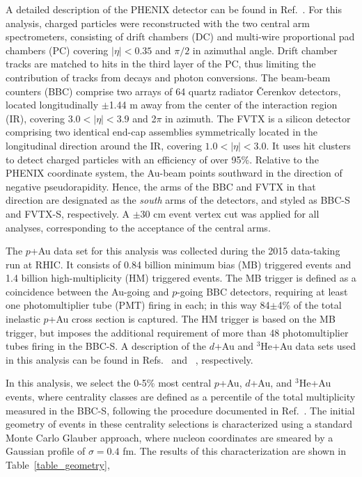 \documentclass[%
reprint,
showpacs,preprintnumbers,
 amsmath,amssymb,
 aps,
]{revtex4-1}
\newcommand{\dau}{\mbox{$d$+Au}\xspace}
\newcommand{\pau}{\mbox{$p$+Au}\xspace}
\newcommand{\hau}{\mbox{$^3\text{He}$+Au}\xspace}
\newcommand{\bbceta}{\mbox{$3.0<|\eta|<3.9$}\xspace}
\begin{document}
A detailed description of the PHENIX detector can be found in Ref.~\cite{Adcox2003469}. For this analysis, charged particles were reconstructed with the two central arm spectrometers, consisting of drift chambers (DC) and multi-wire proportional pad chambers (PC) covering $|\eta|<0.35$ and $\pi/2$ in azimuthal angle. Drift chamber tracks are matched to hits in the third layer of the PC, thus limiting the contribution of tracks from decays and photon conversions. The beam-beam counters (BBC) comprise two arrays of 64 quartz radiator \v{C}erenkov detectors, located longitudinally $\pm$1.44 m away from the center of the interaction region (IR), covering \bbceta and 2$\pi$ in azimuth. The FVTX is a silicon detector comprising two identical end-cap assemblies symmetrically located in the longitudinal direction around the IR, covering $1.0 < |\eta| < 3.0$. It uses hit clusters to detect charged particles with an efficiency of over 95\%. Relative to the PHENIX coordinate system, the Au-beam points southward in the direction of negative pseudorapidity. Hence, the arms of the BBC and FVTX in that direction are designated as the \emph{south} arms of the detectors, and styled as BBC-S and FVTX-S, respectively.
A $\pm$30 cm event vertex cut was applied for all analyses, corresponding to the acceptance of the central arms. 


The \pau data set for this analysis was collected during the 2015 data-taking run at RHIC. It consists of 0.84 billion minimum bias (MB) triggered events and 1.4 billion high-multiplicity (HM) triggered events. The MB trigger is defined as a coincidence between the Au-going and $p$-going BBC detectors, requiring at least one photomultiplier tube (PMT) firing in each; in this way 84$\pm$4\% of the total inelastic \pau cross section is captured. The HM trigger is based on the MB trigger, but imposes the additional requirement of more than 48 photomultiplier tubes firing in the BBC-S. A description of the \dau and \hau data sets used in this analysis can be found in Refs.~\cite{adare_measurement_2014} and ~\cite{PhysRevLett.115.142301}, respectively. 

In this analysis, we select the 0-5\% most central \pau, \dau, and \hau events, where 
centrality classes are defined as a percentile of the total multiplicity measured in the BBC-S, following the procedure documented in Ref.~\cite{bbc}.
The initial geometry of events in these centrality selections is characterized using a standard Monte Carlo Glauber approach, where nucleon coordinates are smeared by a Gaussian profile of $\sigma = 0.4$ fm. The results of this characterization are shown in Table~\ref{table_geometry}, 
\end{document}

